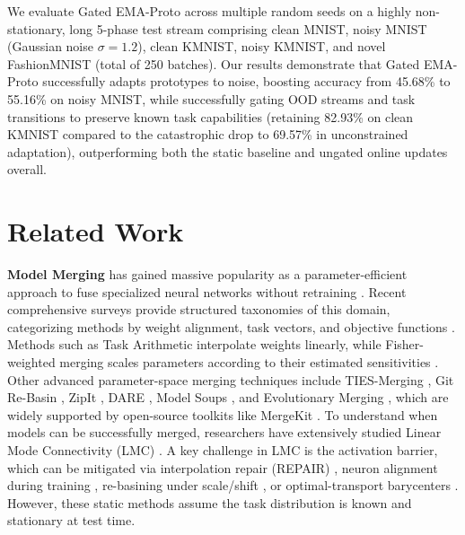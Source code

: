 \documentclass{article}
\theoremstyle{plain}
\theoremstyle{definition}
\theoremstyle{remark}
\begin{document}
We evaluate Gated EMA-Proto across multiple random seeds on a highly non-stationary, long 5-phase test stream comprising clean MNIST, noisy MNIST (Gaussian noise $\sigma=1.2$), clean KMNIST, noisy KMNIST, and novel FashionMNIST (total of 250 batches). Our results demonstrate that Gated EMA-Proto successfully adapts prototypes to noise, boosting accuracy from 45.68\% to 55.16\% on noisy MNIST, while successfully gating OOD streams and task transitions to preserve known task capabilities (retaining 82.93\% on clean KMNIST compared to the catastrophic drop to 69.57\% in unconstrained adaptation), outperforming both the static baseline and ungated online updates overall.

\section{Related Work}
\label{sec:related}
\textbf{Model Merging} has gained massive popularity as a parameter-efficient approach to fuse specialized neural networks without retraining \cite{fisher_merging, deep_model_fusion_survey}. Recent comprehensive surveys provide structured taxonomies of this domain, categorizing methods by weight alignment, task vectors, and objective functions \cite{model_merging_survey_2026, model_merging_acm_2026, wolfe2024model, scale_intelligence_merging}. Methods such as Task Arithmetic \cite{task_arithmetic, task_arithmetic_parameter} interpolate weights linearly, while Fisher-weighted merging scales parameters according to their estimated sensitivities \cite{cl_w_fisher, fisher_merging}. Other advanced parameter-space merging techniques include TIES-Merging \cite{ties_merging}, Git Re-Basin \cite{git_rebasin}, ZipIt \cite{zip_it}, DARE \cite{dare}, Model Soups \cite{model_soups}, and Evolutionary Merging \cite{evolutionary_merging}, which are widely supported by open-source toolkits like MergeKit \cite{mergekit_toolkit_2024}. To understand when models can be successfully merged, researchers have extensively studied Linear Mode Connectivity (LMC) \cite{linear_mode_connectivity_2020, second_order_lmc_2025}. A key challenge in LMC is the activation barrier, which can be mitigated via interpolation repair (REPAIR) \cite{repair_iclr_2023}, neuron alignment during training \cite{lmc_neuron_alignment_2024}, re-basining under scale/shift \cite{rethinking_rebasin_2024}, or optimal-transport barycenters \cite{wasserstein_model_fusion}. However, these static methods assume the task distribution is known and stationary at test time.
\end{document}
